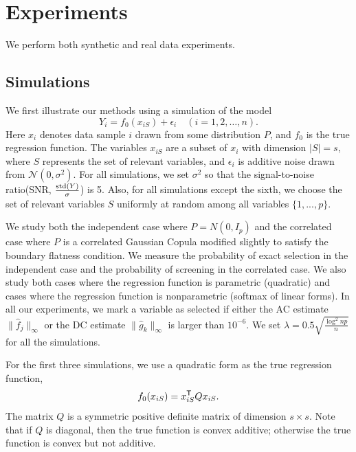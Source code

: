 \def\x{x}
\def\Q{Q}
\def\bds#1{#1}
\def\tts#1{\texttt{\small #1}}

\section{Experiments}
\label{sec:thesims}

We perform both synthetic and real data experiments.

\subsection{Simulations}
We first illustrate our methods using a simulation of the model
\begin{equation}\nonumber
         Y_i = f_0(\x_{iS}) + \epsilon_i \quad (i=1,2,\ldots,n).
\end{equation}
Here $\x_{i}$ denotes data sample $i$ drawn from some distribution
$P$, and $f_0$ is the true regression function. The variables
$\x_{iS}$ are a subset of $\x_i$ with dimension $|S|=s$, where $S$
represents the set of relevant variables, and $\epsilon_i$ is additive
noise drawn from $\mathcal{N}(0,\sigma^2)$. For all simulations, we set
$\sigma^2$ so that the signal-to-noise ratio(SNR,
$\frac{\textrm{std}(Y)}{\sigma}$) is 5. Also, for all simulations except
the sixth, we choose the set of relevant variables $S$ uniformly at
random among all variables $\{1,...,p\}$.

We study both the independent case where $P = N(0, I_p)$ and the
correlated case where $P$ is a correlated Gaussian Copula modified
slightly to satisfy the boundary flatness condition. We measure the
probability of exact selection in the independent case and the
probability of screening in the correlated case. We also study both
cases where the regression function is parametric (quadratic) and
cases where the regression function is nonparametric (softmax of
linear forms). In all our experiments, we mark a variable as selected
if either the AC estimate $\| \hat{f}_j \|_\infty$ or the DC estimate
$\| \hat{g}_k \|_\infty$ is larger than $10^{-6}$. We set $\lambda =
0.5 \sqrt{\frac{\log^2 np}{n}}$ for all the simulations.

For the first three simulations, we use a quadratic form as the true regression function,
\[
f_0(x_{iS}) = x_{iS}^\tran \Q x_{iS}.
\]
The matrix $\Q$ is a symmetric positive definite matrix of dimension $s \times{} s$. 
Note that if $\Q$ is diagonal, then the true function is convex
additive; 
otherwise the true function is convex but not additive.

